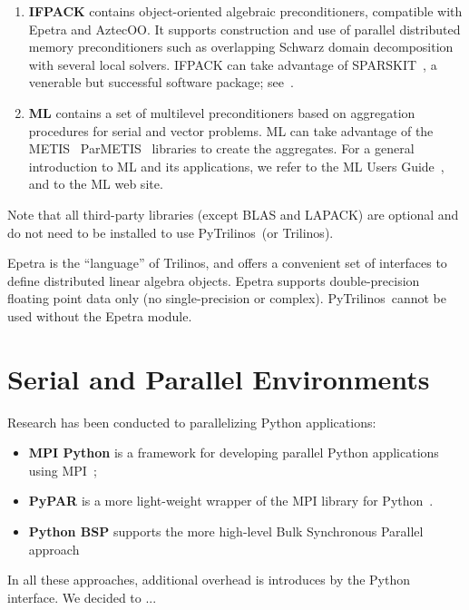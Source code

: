 \documentclass[10pt,relax]{SANDreport}
\newcommand{\PyTrilinos}{{PyTrilinos}}
\begin{document}
\begin{enumerate}
\item {\bf IFPACK} contains object-oriented algebraic preconditioners,
  compatible with Epetra and AztecOO.  It supports construction and
  use of parallel distributed memory preconditioners such as
  overlapping Schwarz domain decomposition with several local solvers.
  IFPACK can take advantage of SPARSKIT~\cite{sparskit}, a venerable
  but successful software package; see~\cite{ifpack-guide}.

\item {\bf ML} contains a set of multilevel preconditioners based on
  aggregation procedures for serial and vector problems. ML can take
  advantage of the METIS~\cite{metis} ParMETIS~\cite{parmetis}
  libraries to create the aggregates.  For a general introduction to
  ML and its applications, we refer to the ML Users
  Guide~\cite{ml-guide}, and to the ML web site.

\end{enumerate}

Note that all third-party libraries (except BLAS and LAPACK) are
optional and do not need to be installed to use \PyTrilinos\ (or
Trilinos).

Epetra is the ``language'' of Trilinos, and offers a convenient set of
interfaces to define distributed linear algebra objects. Epetra
supports double-precision floating point data only (no
single-precision or complex).  \PyTrilinos\ cannot be used without the
Epetra module.

\section{Serial and Parallel Environments}
\label{sec:serial}

Research has been conducted to parallelizing Python applications: 
\begin{itemize}
\item {\bf MPI Python} is a framework for developing parallel Python
  applications using MPI~\cite{MPI-Python};
\item {\bf PyPAR} is a more light-weight wrapper of the MPI library
  for Python~\cite{pypar}.
\item {\bf Python BSP} supports the more high-level Bulk Synchronous
  Parallel approach~\cite{FIXME}
\end{itemize}

In all these approaches, additional overhead is introduces by the
Python interface. We decided to ...
\end{document}
